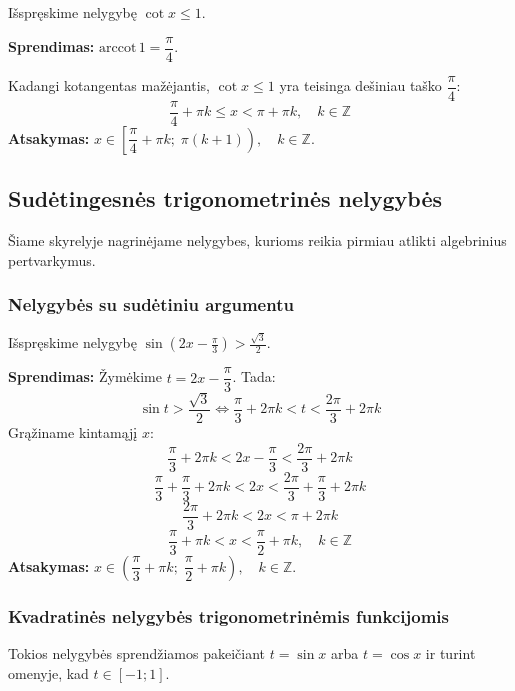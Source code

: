 \begin{example}
Išspręskime nelygybę $\cot x \leq 1$.

\textbf{Sprendimas:} $\text{arccot}\, 1 = \dfrac{\pi}{4}$.

Kadangi kotangentas mažėjantis, $\cot x \leq 1$ yra teisinga dešiniau taško $\dfrac{\pi}{4}$:
\[
\frac{\pi}{4} + \pi k \leq x < \pi + \pi k, \quad k \in \mathbb{Z}
\]
\textbf{Atsakymas:} $x \in \left[\dfrac{\pi}{4} + \pi k;\; \pi(k+1)\right), \quad k \in \mathbb{Z}$.
\end{example}

\subsection{Sudėtingesnės trigonometrinės nelygybės}

Šiame skyrelyje nagrinėjame nelygybes, kurioms reikia pirmiau atlikti algebrinius pertvarkymus.

\subsubsection*{Nelygybės su sudėtiniu argumentu}

\begin{example}
Išspręskime nelygybę $\sin(2x - \tfrac{\pi}{3}) > \tfrac{\sqrt{3}}{2}$.

\textbf{Sprendimas:} Žymėkime $t = 2x - \dfrac{\pi}{3}$. Tada:
\[
\sin t > \frac{\sqrt{3}}{2} \iff \frac{\pi}{3} + 2\pi k < t < \frac{2\pi}{3} + 2\pi k
\]
Grąžiname kintamąjį $x$:
\[
\frac{\pi}{3} + 2\pi k < 2x - \frac{\pi}{3} < \frac{2\pi}{3} + 2\pi k
\]
\[
\frac{\pi}{3} + \frac{\pi}{3} + 2\pi k < 2x < \frac{2\pi}{3} + \frac{\pi}{3} + 2\pi k
\]
\[
\frac{2\pi}{3} + 2\pi k < 2x < \pi + 2\pi k
\]
\[
\frac{\pi}{3} + \pi k < x < \frac{\pi}{2} + \pi k, \quad k \in \mathbb{Z}
\]
\textbf{Atsakymas:} $x \in \left(\dfrac{\pi}{3} + \pi k;\; \dfrac{\pi}{2} + \pi k\right), \quad k \in \mathbb{Z}$.
\end{example}

\subsubsection*{Kvadratinės nelygybės trigonometrinėmis funkcijomis}

Tokios nelygybės sprendžiamos pakeičiant $t = \sin x$ arba $t = \cos x$ ir turint omenyje, kad $t \in [-1; 1]$.

